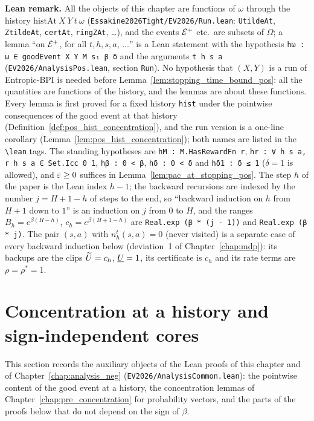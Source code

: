 \textbf{Lean remark.} All the objects of this chapter are functions of $\omega$ through the
history $\mathrm{histAt}\ X\ Y\ t\ \omega$ (\texttt{Essakine2026Tight/EV2026/Run.lean}:
\texttt{UtildeAt}, \texttt{ZtildeAt}, \texttt{certAt}, \texttt{ringZAt}, \ldots), and the
events $\mathcal{E}^+$ etc.\ are subsets of $\Omega$; a lemma ``on $\mathcal{E}^+$, for all $t, h, s, a$,
$\ldots$'' is a Lean statement with the hypothesis \texttt{hω : ω ∈ goodEvent X Y M s₁ β δ} and
the arguments \texttt{t h s a} (\texttt{EV2026/AnalysisPos.lean}, section \texttt{Run}). No hypothesis
that $(X, Y)$ is a run of Entropic-BPI is needed before Lemma~\ref{lem:stopping_time_bound_pos}: all the
quantities are functions of the history, and the lemmas are about these functions. Every lemma is
first proved for a fixed history \texttt{hist} under the pointwise consequences of the good event at
that history (Definition~\ref{def:pos_hist_concentration}), and the run version is a one-line
corollary (Lemma~\ref{lem:pos_hist_concentration}); both names are listed in the \texttt{\textbackslash lean}
tags. The standing hypotheses are \texttt{hM : M.HasRewardFn r}, \texttt{hr : ∀ h s a, r h s a ∈ Set.Icc 0 1},
\texttt{hβ : 0 < β}, \texttt{hδ : 0 < δ} and \texttt{hδ1 : δ ≤ 1} ($\delta = 1$ is allowed), and
$\varepsilon \ge 0$ suffices in Lemma~\ref{lem:pac_at_stopping_pos}. The
step $h$ of the paper is the Lean index $h - 1$; the backward recursions are indexed by the
number $j = H + 1 - h$ of steps to the end, so ``backward induction on $h$ from $H + 1$ down to
$1$'' is an induction on $j$ from $0$ to $H$, and the ranges $B_h = e^{\beta(H-h)}$,
$c_h = e^{\beta(H+1-h)}$ are \texttt{Real.exp (β * (j - 1))} and \texttt{Real.exp (β * j)}.
The pair $(s, a)$ with $n_h^t(s,a) = 0$ (never visited) is a separate case of every
backward induction below (deviation~1 of Chapter~\ref{chap:mdp}): its backups are the clips
$\widetilde{U} = c_h$, $\underline{U} = 1$, its certificate is $c_h$ and its rate terms are $\rho = \rho^* = 1$.

\section{Concentration at a history and sign-independent cores}
\label{sec:pos_cores}

This section records the auxiliary objects of the Lean proofs of this chapter and of
Chapter~\ref{chap:analysis_neg} (\texttt{EV2026/AnalysisCommon.lean}): the pointwise content of the
good event at a history, the concentration lemmas of Chapter~\ref{chap:pre_concentration} for
probability vectors, and the parts of the proofs below that do not depend on the sign of $\beta$.

